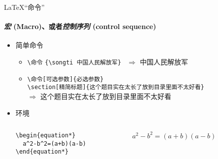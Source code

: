 \begin{frame}[fragile]{\LaTeX{}“命令”}
  \framesubtitle{\emph{宏} (Macro)、或者\emph{控制序列} (control sequence)}
\begin{itemize}
\item 简单命令
  \begin{itemize}
    \item \verb|\命令|\hspace{2em}
    \verb|{\songti 中国人民解放军}| ~$\Rightarrow$ {\songti 中国人民解放军}
  \item \verb|\命令[可选参数]{必选参数}|\\
\verb|\section[精简标题]{这个题目实在太长了放到目录里面不太好看}|\\
$\Rightarrow$ { \hspace{1em} \songti 这个题目实在太长了放到目录里面不太好看}
  \end{itemize}
\item 环境
  \begin{columns}[c]
  \begin{column}{0.45\textwidth}
    \begin{lstlisting}[basicstyle=\ttfamily]
\begin{equation*}
  a^2-b^2=(a+b)(a-b)
\end{equation*}
\end{lstlisting}
\end{column}\hspace{1em}
  \begin{column}{0.45\textwidth}
$ a^2-b^2=(a+b)(a-b)$
\end{column}
  \end{columns}
\end{itemize}
\end{frame}

